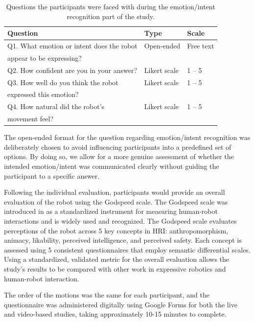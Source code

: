 \begin{table}[H]
\centering
\begin{tabular}{|l|l|l|}
    \hline
    \textbf{Question} & \textbf{Type} & \textbf{Scale} \\
    \hline
    Q1. What emotion or intent does the robot & Open-ended & Free text \\
    appear to be expressing? & & \\
    \hline
    Q2. How confident are you in your answer? & Likert scale & 1 -- 5 \\
    \hline
    Q3. How well do you think the robot & Likert scale & 1 -- 5 \\
    expressed this emotion? & & \\
    \hline
    Q4. How natural did the robot's & Likert scale & 1 -- 5 \\
    movement feel? & & \\
    \hline
\end{tabular}
\caption{Questions the participants were faced with during the emotion/intent recognition part of the study.}
\label{tab:questionnaire}
\end{table}

The open-ended format for the question regarding emotion/intent recognition was deliberately chosen to avoid influencing participants into a predefined set of options. By doing so, we allow for a more genuine assessment of whether the intended emotion/intent was communicated clearly without guiding the participant to a specific answer.

Following the individual evaluation, participants would provide an overall evaluation of the robot using the Godspeed scale. The Godspeed scale was introduced in \cite{bartneck_measurement_2008} as a standardized instrument for measuring human-robot interactions and is widely used and recognized. The Godspeed scale evaluates perceptions of the robot across 5 key concepts in HRI: anthropomorphism, animacy, likability, perceived intelligence, and perceived safety. Each concept is assessed using 5 consistent questionnaires that employ semantic differential scales. Using a standardized, validated metric for the overall evaluation allows the study's results to be compared with other work in expressive robotics and human-robot interaction.

The order of the motions was the same for each participant, and the questionnaire was administered digitally using Google Forms for both the live and video-based studies, taking approximately 10-15 minutes to complete.

